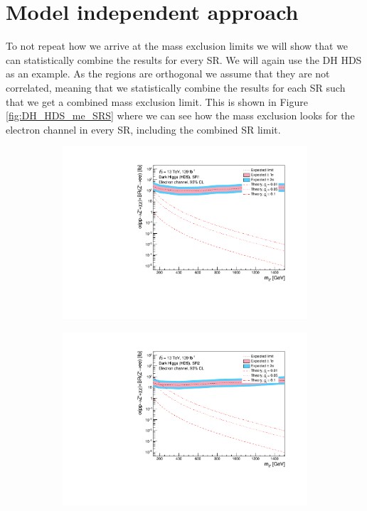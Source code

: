 \documentclass[12pt, a4paper]{book}
\begin{document}
\section{Model independent approach}
To not repeat how we arrive at the mass exclusion limits we will show that we can statistically combine the results for every SR. We will again use the DH HDS as an example. As the regions are orthogonal we assume that they are not correlated, 
meaning that we statistically combine the results for each SR such that we get a combined mass exclusion limit. This is shown in Figure \ref{fig:DH_HDS_me_SRS} where we can see how the mass exclusion looks for
the electron channel in every SR, including the combined SR limit. 
\begin{figure}[!ht]
	\centering
	\begin{subfigure}[b]{0.49\textwidth}
      \centering
      \includegraphics[width=1\textwidth]{Limits/Model_independent/50-100/DH_HDS/mass_exclusion_ee.pdf}
   \end{subfigure}
   \hfill
   \begin{subfigure}[b]{0.49\textwidth}
      \centering
      \includegraphics[width=1\textwidth]{Limits/Model_independent/100-150/DH_HDS/mass_exclusion_ee.pdf}

\end{subfigure}
\end{figure}
\end{document}
